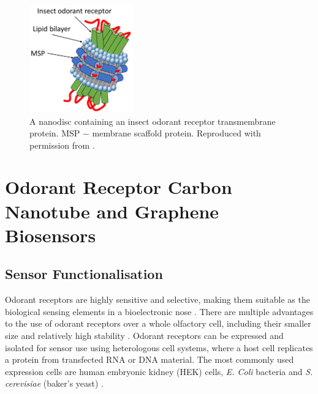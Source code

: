 \documentclass[
  a4paper,
]{scrbook}
\begin{document}
\begin{figure}

{\centering \includegraphics[width=0.4\textwidth,height=\textheight]{figures/ch3/iOR_nanodisc.png}

}

\caption{\label{fig-msp-iOR-nanodisc}A nanodisc containing an insect
odorant receptor transmembrane protein. MSP \(-\) membrane scaffold
protein. Reproduced with permission from \autocite{Murugathas2019a}.}

\end{figure}

\hypertarget{odorant-receptor-carbon-nanotube-and-graphene-biosensors}{%
\section{Odorant Receptor Carbon Nanotube and Graphene
Biosensors}\label{odorant-receptor-carbon-nanotube-and-graphene-biosensors}}

\hypertarget{sec-sensor-types}{%
\subsection{Sensor Functionalisation}\label{sec-sensor-types}}

Odorant receptors are highly sensitive and selective, making them
suitable as the biological sensing elements in a bioelectronic nose
\autocite{Dung2018}. There are multiple advantages to the use of odorant
receptors over a whole olfactory cell, including their smaller size and
relatively high stability \autocite{Dung2018}. Odorant receptors can be
expressed and isolated for sensor use using heterologous cell systems,
where a host cell replicates a protein from transfected RNA or DNA
material. The most commonly used expression cells are human embryonic
kidney (HEK) cells, \emph{E. Coli} bacteria and \emph{S. cerevisiae}
(baker's yeast) \autocite{Dung2018}.
\end{document}
